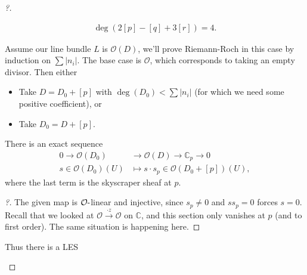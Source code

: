\begin{proof}[?]
\begin{example}[?]

\begin{align*}
\deg( 2[p] -[q] + 3[r]) = 4
.\end{align*}

\end{example}

\begin{remark}

Assume our line bundle \(L\) is \({\mathcal{O}}(D)\), we'll prove
Riemann-Roch in this case by induction on
\(\sum {\left\lvert {n_i} \right\rvert}\). The base case is
\({\mathcal{O}}\), which corresponds to taking an empty divisor. Then
either

\begin{itemize}
\tightlist
\item
  Take \(D = D_0 + [p]\) with
  \(\deg(D_0) < \sum {\left\lvert {n_i} \right\rvert}\) (for which we
  need some positive coefficient), or
\item
  Take \(D_0 = D + [p]\).
\end{itemize}

\end{remark}

\begin{claim}

There is an exact sequence
\begin{align*}
0 \to {\mathcal{O}}(D_0) &\to {\mathcal{O}}(D) \to {\mathbb{C}}_p \to 0\\
s\in {\mathcal{O}}(D_0)(U) &\mapsto s \cdot s_p \in {\mathcal{O}}( D_0 + [p] ) (U)
,\end{align*}
where the last term is the skyscraper sheaf at \(p\).

\end{claim}

\begin{proof}[?]

The given map is \({\mathcal{O}}{\hbox{-}}\)linear and injective, since
\(s_p\neq 0\) and \(s s_p=0\) forces \(s=0\). Recall that we looked at
\({\mathcal{O}}\xrightarrow{\cdot z} {\mathcal{O}}\) on
\({\mathbb{C}}\), and this section only vanishes at \(p\) (and to first
order). The same situation is happening here.

\end{proof}

Thus there is a LES

\begin{center}
\end{center}


\end{proof}
